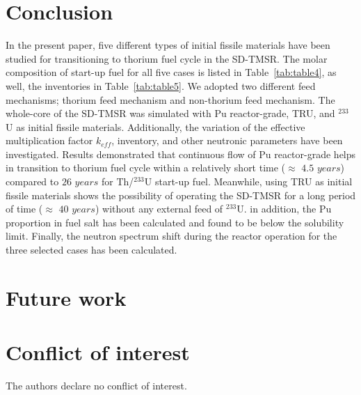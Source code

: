 \section{Conclusion} \label{Conclusion}

In the present paper, five different types of initial fissile materials have been studied for transitioning to thorium fuel cycle in the \gls{SD-TMSR}. The molar composition of start-up fuel for all five cases is listed in Table~\ref{tab:table4}, as well, the inventories in Table~\ref{tab:table5}. We adopted two different feed mechanisms; thorium feed mechanism and non-thorium feed mechanism. The whole-core of the SD-TMSR was simulated with Pu reactor-grade, TRU, and $^{233}$U as initial fissile materials. Additionally, the variation of the effective multiplication factor $k_{eff}$, inventory, and other neutronic parameters have been investigated. Results demonstrated that continuous flow of Pu reactor-grade helps in transition to thorium fuel cycle within a relatively short time ($\approx$ $4.5$ $years$) compared to $26$ $years$ for Th/$^{233}$U start-up fuel. Meanwhile, using \gls{TRU} as initial fissile materials shows the possibility of operating the SD-TMSR for a long period of time ($\approx$ $40$ $years$) without any external feed of $^{233}$U. in addition, the Pu proportion in fuel salt has been calculated and found to be below the solubility limit. Finally, the neutron spectrum shift during the reactor operation for the three selected cases has been calculated.

\section{Future work}


\section{Conflict of interest}

The authors declare no conflict of interest. 
